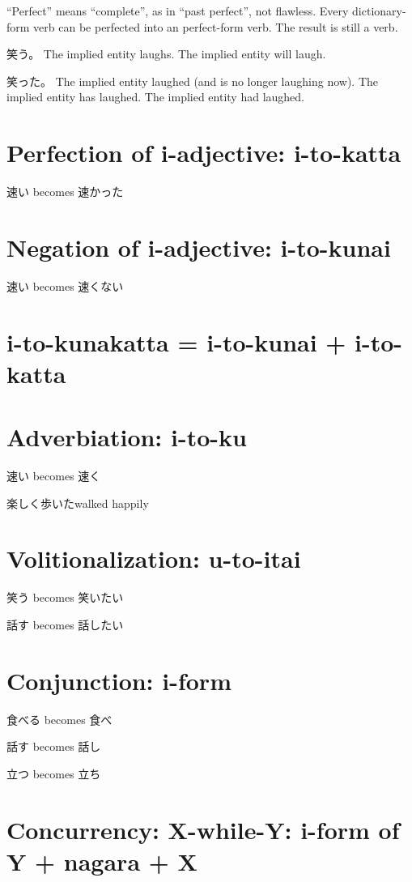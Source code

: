 ``Perfect'' means ``complete'', as in ``past perfect'', not flawless.
Every dictionary-form verb can be perfected into an perfect-form verb.
The result is still a verb.

笑う。
The implied entity laughs.
The implied entity will laugh.

笑った。
The implied entity laughed (and is no longer laughing now).
The implied entity has laughed.
The implied entity had laughed.

\section{Perfection of i-adjective: i-to-katta}

速い becomes 速かった

\section{Negation of i-adjective: i-to-kunai}

速い becomes 速くない

\section{i-to-kunakatta = i-to-kunai + i-to-katta}

\section{Adverbiation: i-to-ku}

速い becomes 速く

楽しく歩いたwalked happily

\section{Volitionalization: u-to-itai}

笑う becomes 笑いたい

話す becomes 話したい

\section{Conjunction: i-form}

食べる becomes 食べ

話す becomes 話し

立つ becomes 立ち

\section{Concurrency: X-while-Y: i-form of Y + nagara + X}


